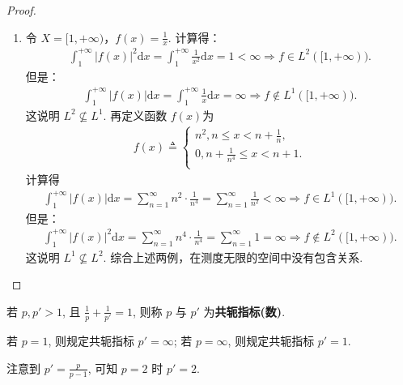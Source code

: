 \documentclass[../../main.tex]{subfiles}%
\begin{document}
\begin{proof}
\begin{enumerate}[(1)]
\item 令 \(X = [1, +\infty)\)，\(f(x) = \frac{1}{x}\). 计算得：
\begin{align*}
\int_{1}^{+\infty} |f(x)|^2 \mathrm{d}x = \int_{1}^{+\infty} \frac{1}{x^2} \mathrm{d}x = 1 < \infty \Longrightarrow f \in L^2([1, +\infty)).
\end{align*}
但是：
\begin{align*}
\int_{1}^{+\infty} |f(x)| \mathrm{d}x = \int_{1}^{+\infty} \frac{1}{x} \mathrm{d}x = \infty \Longrightarrow f \notin L^1([1, +\infty)).
\end{align*}
这说明 \(L^2 \not\subseteq L^1.\)
再定义函数 \(f(x)\)为
\begin{align*}
f(x)\triangleq \begin{cases}
n^2,n\leqslant x<n+\frac{1}{n},\\
0,n+\frac{1}{n^4}\leqslant x<n+1.\\
\end{cases}
\end{align*}
计算得
\begin{align*}
\int_{1}^{+\infty} |f(x)| \mathrm{d}x = \sum\limits_{n=1}^{\infty} n^2 \cdot \frac{1}{n^4} = \sum\limits_{n=1}^{\infty} \frac{1}{n^2} < \infty \Longrightarrow f \in L^1([1, +\infty)).
\end{align*}
但是：
\begin{align*}
\int_{1}^{+\infty} |f(x)|^2 \mathrm{d}x = \sum\limits_{n=1}^{\infty} n^4 \cdot \frac{1}{n^4} = \sum\limits_{n=1}^{\infty} 1 = \infty \Longrightarrow f \notin L^2([1, +\infty)).
\end{align*}
这说明 \(L^1 \not\subseteq L^2.\) 综合上述两例，在测度无限的空间中没有包含关系.
\end{enumerate}
\end{proof}

\begin{definition}[共轭指标]
若 $p,p'>1$, 且 $\frac{1}{p}+\frac{1}{p'}=1$, 则称 $p$ 与 $p'$ 为\textbf{共轭指标(数)}.

若 $p=1$, 则规定共轭指标 $p'=\infty$; 若 $p=\infty$, 则规定共轭指标 $p'=1$.
\end{definition}
\begin{remark}
注意到 $p'=\frac{p}{p-1}$, 可知 $p=2$ 时 $p'=2$.
\end{remark}
\end{document}
